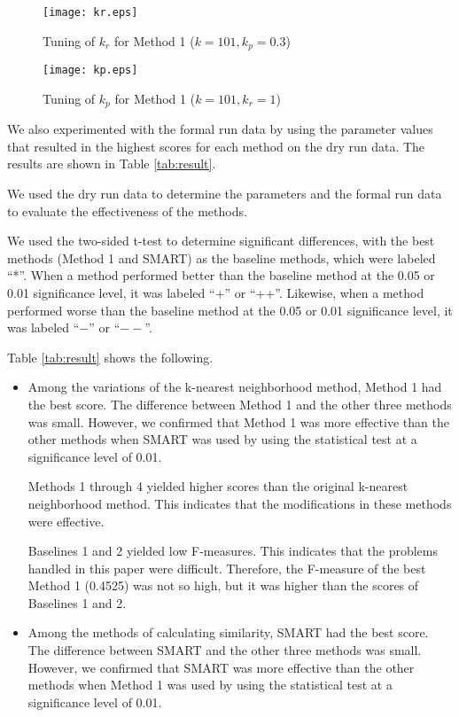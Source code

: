 \documentclass[english]{jnlp_1.2c}
\begin{document}
\begin{figure}[p]
      \begin{center}
        \texttt{[image: kr.eps]} 
      \end{center}
    \caption{Tuning of $k_r$ for Method 1 ($k=101,k_p=0.3$)}
    \label{fig:kr}
    \vspace{\baselineskip}
      \begin{center}
        \texttt{[image: kp.eps]} 
      \end{center}
    \caption{Tuning of $k_p$ for Method 1 ($k=101,k_r=1$)}
    \label{fig:kp}
\end{figure}

We also experimented with the formal run data by using 
the parameter values 
that resulted in the highest scores for each method
on the dry run data. 
The results are shown in Table \ref{tab:result}.

We used the dry run data to determine the parameters
and the formal run data to evaluate the effectiveness of the methods. 

We used the two-sided t-test to determine significant differences,
with the best methods (Method 1 and SMART) as the baseline methods, which were labeled ``*''.
When a method performed better than the baseline method at the 0.05 or 0.01 significance level,
it was labeled ``+'' or ``++''.
Likewise, when a method performed worse than the baseline method at the 0.05 or 0.01 significance level,
it was labeled ``$-$'' or ``$--$''.

Table \ref{tab:result} shows the following.
\begin{itemize}
\item 
Among the variations of the k-nearest neighborhood method, 
Method 1 had the best score. 
The difference between Method 1 and 
the other three methods was small. 
However, we confirmed that 
Method 1 was more effective than the other methods 
when SMART was used
by using the statistical test at a significance level of 0.01.

Methods 1 through 4 yielded higher scores than the original k-nearest neighborhood method. 
This indicates that 
the modifications in these methods were effective. 

Baselines 1 and 2 yielded low F-measures. 
This indicates that 
the problems handled in this paper 
were difficult. 
Therefore, 
the F-measure of the best Method 1 (0.4525) was not 
so high, but it was higher 
than the scores of Baselines 1 and 2. 

\item 
Among the methods of calculating 
similarity, 
SMART had the best score.
The difference between SMART and 
the other three methods was small.
However, we confirmed that 
SMART was more effective than the other methods 
when Method 1 was used
by using the statistical test at a significance 
level of 0.01.
\end{itemize}
\end{document}
